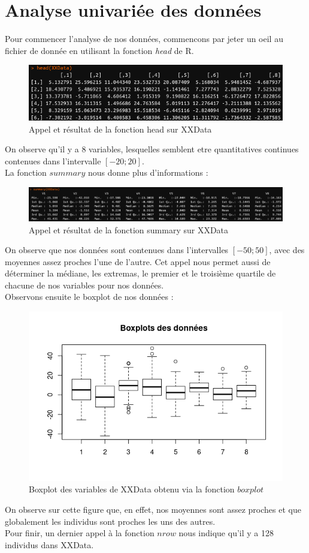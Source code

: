 \documentclass[11pt]{article}
\begin{document}
\section{Analyse univariée des données}
Pour commencer l'analyse de nos données, commencons par jeter un oeil au fichier de donnée en utilisant la fonction \emph{head} de R.
\begin{figure}[H]
\centering
\includegraphics[scale=.75]{head.png}
\caption{Appel et résultat de la fonction head sur XXData}
\end{figure}
\noindent On observe qu'il y a 8 variables, lesquelles semblent etre quantitatives continues contenues dans l'intervalle $[-20;20]$.\\
La fonction $summary$ nous donne plus d'informations :
\begin{figure}[H]
\centering
\includegraphics[scale=.5]{summary.png}
\caption{Appel et résultat de la fonction summary sur XXData}
\end{figure}
\noindent On observe que nos données sont contenues dans l'intervalles $[-50;50]$, avec des moyennes assez proches l'une de l'autre. Cet appel nous permet aussi de déterminer la médiane, les extremas, le premier et le troisième quartile de chacune de nos variables pour nos données.\\
\newpage
\noindent Observons ensuite le boxplot de nos données :
\begin{figure}[H]
\centering
\includegraphics[scale=1]{boxplot.png}
\caption{Boxplot des variables de XXData obtenu via la fonction $boxplot$}
\end{figure}
\noindent On observe sur cette figure que, en effet, nos moyennes sont assez proches et que globalement les individus sont proches les uns des autres.\\
Pour finir, un dernier appel à la fonction $nrow$ nous indique qu'il y a 128 individus dans XXData.
\newpage
\end{document}
